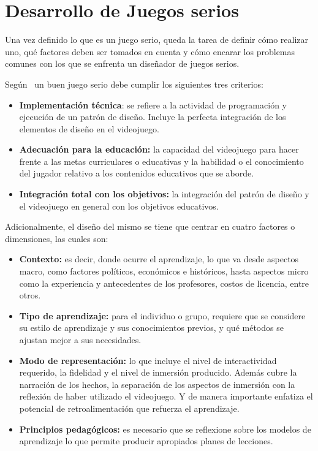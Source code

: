 \section{Desarrollo de Juegos serios}
\label{sec:desarrollo}

Una vez definido lo que es un juego serio, queda la tarea de definir cómo
realizar uno, qué factores deben ser tomados en cuenta y cómo encarar los
problemas comunes con los que se enfrenta un diseñador de juegos serios.

Según~\cite{education:games} un buen juego serio debe cumplir los siguientes
tres criterios:

\begin{itemize}

\item \textbf{Implementación técnica}: se refiere a la actividad de programación
    y ejecución de un patrón de diseño. Incluye la perfecta integración de los
    elementos de diseño en el videojuego. 

\item \textbf{Adecuación para la educación:} la capacidad del videojuego para hacer
    frente a las metas curriculares o educativas y la habilidad o el
    conocimiento del jugador relativo a los contenidos educativos que se aborde.

\item \textbf{Integración total con los objetivos:} la integración del patrón de
    diseño y el videojuego en general con los objetivos educativos.

\end{itemize}


Adicionalmente, el diseño del mismo se tiene que centrar en cuatro factores o
dimensiones, las cuales son\cite{education:games}:

\begin{itemize}
\item \textbf{Contexto:} es decir, donde ocurre el aprendizaje, lo que va desde
    aspectos macro, como  factores políticos, económicos e históricos, hasta
    aspectos micro como la experiencia y  antecedentes de los profesores, costos
    de licencia, entre otros.
\item \textbf{Tipo de aprendizaje:} para el individuo o grupo, requiere que se
    considere su  estilo de aprendizaje y sus conocimientos previos, y qué
    métodos se ajustan mejor a sus  necesidades.
\item \textbf{Modo de representación:} lo que incluye el nivel de interactividad
    requerido, la fidelidad y  el nivel de inmersión producido. Además cubre la
    narración de los hechos, la separación de los  aspectos de inmersión con la
    reflexión de haber utilizado el videojuego. Y de manera importante  enfatiza
    el potencial de retroalimentación que refuerza el aprendizaje.
\item \textbf{Principios pedagógicos:} es necesario que se reflexione sobre los
    modelos de aprendizaje lo  que permite producir apropiados planes de
    lecciones.
\end{itemize}

